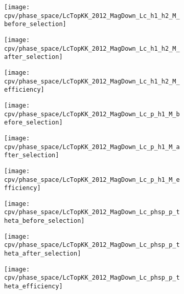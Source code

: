 \begin{figure}
  \centering

  \begin{subfigure}{0.25\textwidth}
    \texttt{[image: cpv/phase\_space/LcTopKK\_2012\_MagDown\_Lc\_h1\_h2\_M\_before\_selection]}
    \label{fig:cpv:phsp:effs:pKK:Lc_h1_h2_M:before}
  \end{subfigure}
  \begin{subfigure}{0.25\textwidth}
    \texttt{[image: cpv/phase\_space/LcTopKK\_2012\_MagDown\_Lc\_h1\_h2\_M\_after\_selection]}
    \label{fig:cpv:phsp:effs:pKK:Lc_h1_h2_M:after}
  \end{subfigure}
  \begin{subfigure}{0.25\textwidth}
    \texttt{[image: cpv/phase\_space/LcTopKK\_2012\_MagDown\_Lc\_h1\_h2\_M\_efficiency]}
    \label{fig:cpv:phsp:effs:pKK:Lc_h1_h2_M:eff}
  \end{subfigure}

  \begin{subfigure}{0.25\textwidth}
    \texttt{[image: cpv/phase\_space/LcTopKK\_2012\_MagDown\_Lc\_p\_h1\_M\_before\_selection]}
    \label{fig:cpv:phsp:effs:pKK:Lc_p_h1_M:before}
  \end{subfigure}
  \begin{subfigure}{0.25\textwidth}
    \texttt{[image: cpv/phase\_space/LcTopKK\_2012\_MagDown\_Lc\_p\_h1\_M\_after\_selection]}
    \label{fig:cpv:phsp:effs:pKK:Lc_p_h1_M:after}
  \end{subfigure}
  \begin{subfigure}{0.25\textwidth}
    \texttt{[image: cpv/phase\_space/LcTopKK\_2012\_MagDown\_Lc\_p\_h1\_M\_efficiency]}
    \label{fig:cpv:phsp:effs:pKK:Lc_p_h1_M:eff}
  \end{subfigure}

  \begin{subfigure}{0.25\textwidth}
    \texttt{[image: cpv/phase\_space/LcTopKK\_2012\_MagDown\_Lc\_phsp\_p\_theta\_before\_selection]}
    \label{fig:cpv:phsp:effs:pKK:Lc_phsp_p_theta:before}
  \end{subfigure}
  \begin{subfigure}{0.25\textwidth}
    \texttt{[image: cpv/phase\_space/LcTopKK\_2012\_MagDown\_Lc\_phsp\_p\_theta\_after\_selection]}
    \label{fig:cpv:phsp:effs:pKK:Lc_phsp_p_theta:after}
  \end{subfigure}
  \begin{subfigure}{0.25\textwidth}
    \texttt{[image: cpv/phase\_space/LcTopKK\_2012\_MagDown\_Lc\_phsp\_p\_theta\_efficiency]}
    \label{fig:cpv:phsp:effs:pKK:Lc_phsp_p_theta:eff}
  \end{subfigure}


\end{figure}

